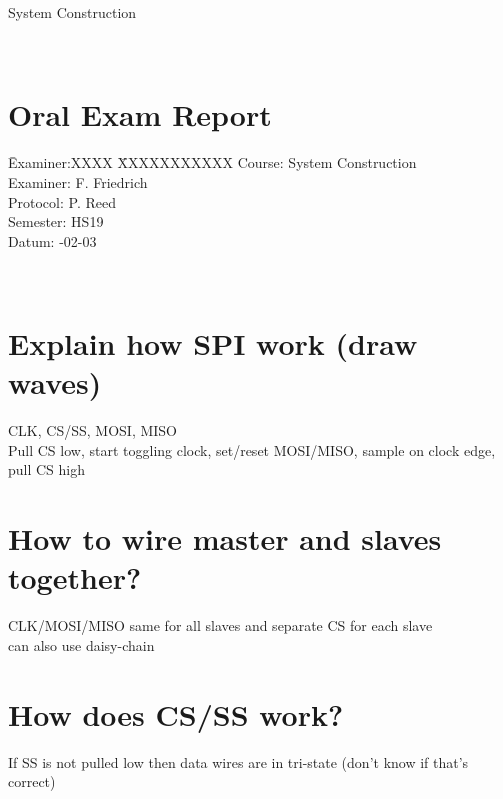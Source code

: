 \documentclass[a4paper,12pt]{article}
\title{\headtitle}
\author{VIS}
\def\headtitle{System Construction} %
\begin{document}
\pagestyle{empty}
\parindent 0pt	%
\flushleft %
%
%
\color[rgb]{0,0,.5}
{\LARGE \headtitle\par}
\hrulefill\\
%
\section*{Oral Exam Report}
\vspace{.5cm}
  \begin{tabbing}
    \quad \= Examiner:XXXX \= XXXXXXXXXXX \kill %
    \>Course:		\>	\headtitle\\[1ex]
    \>Examiner: 	\>	F. Friedrich\\[1ex]	%
    \>Protocol: 	\>	P. Reed\\[1ex]	%
    \>Semester:	\>	HS19\\[1ex]	%
    \>Datum: 		-02-03%
  \end{tabbing}
%
\hrulefill\\
\color{black}
\vspace{.7cm}

\section{Explain how SPI work (draw waves)}
CLK, CS/SS, MOSI, MISO \\
Pull CS low, start toggling clock, set/reset MOSI/MISO, sample on clock edge, pull CS high

\section{How to wire master and slaves together?}
CLK/MOSI/MISO same for all slaves and separate CS for each slave \\
can also use daisy-chain

\section{How does CS/SS work?}
If SS is not pulled low then data wires are in tri-state (don't know if that's correct)
\end{document}
